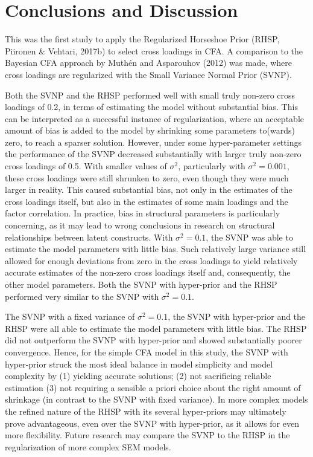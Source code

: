 \documentclass[
  man, donotrepeattitle,floatsintext]{apa6}
\begin{document}
\section{Conclusions and Discussion}\label{conclusions-and-discussion}

This was the first study to apply the Regularized Horseshoe Prior (RHSP, Piironen \& Vehtari, 2017b) to select cross loadings in CFA. A comparison
to the Bayesian CFA approach by Muthén and Asparouhov (2012) was made, where
cross loadings are regularized with the Small Variance Normal Prior
(SVNP).

Both the SVNP and the RHSP performed well with small truly non-zero
cross loadings of 0.2, in terms of estimating the model without
substantial bias. This can be interpreted as a successful instance of
regularization, where an acceptable amount of bias is added to the model
by shrinking some parameters to(wards) zero, to reach a sparser
solution. However, under some hyper-parameter settings the performance of
the SVNP decreased substantially with larger truly non-zero cross
loadings of 0.5. With smaller values of \(\sigma^2\), particularly with
\(\sigma^2 = 0.001\), these cross loadings were still shrunken to zero,
even though they were much larger in reality. This caused substantial
bias, not only in the estimates of the cross loadings itself, but also
in the estimates of some main loadings and the factor correlation. In
practice, bias in structural parameters is particularly concerning, as
it may lead to wrong conclusions in research on structural relationships
between latent constructs. With \(\sigma^2 = 0.1\), the SVNP was able to
estimate the model parameters with little bias. Such relatively large
variance still allowed for enough deviations from zero in the cross
loadings to yield relatively accurate estimates of the non-zero cross
loadings itself and, consequently, the other model parameters. Both the SVNP with hyper-prior and the RHSP performed very similar to the SVNP with \(\sigma^2 = 0.1\).

The SVNP with a fixed variance of \(\sigma^2 = 0.1\), the SVNP with hyper-prior and the RHSP were all able to estimate the model parameters with little bias. The RHSP did not outperform the SVNP with hyper-prior and showed substantially poorer convergence. Hence, for the simple CFA model in this study, the SVNP with hyper-prior struck the most ideal balance in model simplicity and model complexity by (1) yielding accurate solutions; (2) not sacrificing reliable estimation (3) not requiring a sensible a priori choice about the right amount of shrinkage (in contrast to the SVNP with fixed variance). In more complex models the refined nature of the RHSP with its several hyper-priors may ultimately prove advantageous, even over the SVNP with hyper-prior, as it allows for even more flexibility. Future research may compare the SVNP to the RHSP in the regularization of more complex SEM models.
\end{document}
